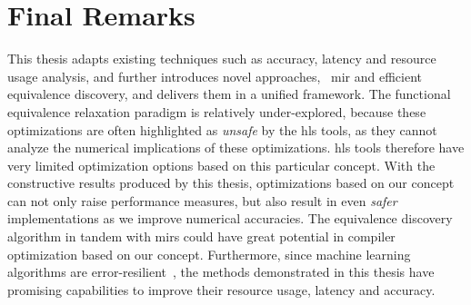 \section{Final Remarks}
\label{cc:sec:final_remarks}

This thesis adapts existing techniques such as accuracy, latency and resource
usage analysis, and further introduces novel approaches, \eg~\gls{mir} and
efficient equivalence discovery, and delivers them in a unified framework.
The functional equivalence relaxation paradigm is relatively under-explored,
because these optimizations are often highlighted as \emph{unsafe} by the
\gls{hls} tools, as they cannot analyze the numerical implications of these
optimizations.  \Gls{hls} tools therefore have very limited optimization
options based on this particular concept.  With the constructive results
produced by this thesis, optimizations based on our concept can not only raise
performance measures, but also result in even \emph{safer} implementations
as we improve numerical accuracies.  The equivalence discovery algorithm in
tandem with \glspl{mir} could have great potential in compiler optimization
based on our concept.  Furthermore, since machine learning algorithms are
error-resilient~\cite{lesser11, kim09, holt91, zhu03}, the methods demonstrated
in this thesis have promising capabilities to improve their resource usage,
latency and accuracy.
